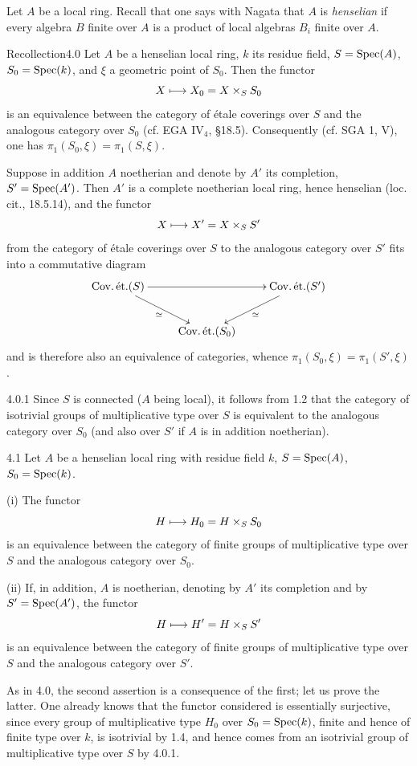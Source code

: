 Let $A$ be a local ring. Recall that one says with Nagata that $A$ is \emph{henselian} if every algebra $B$ finite over $A$ is a product of local algebras $B_i$ finite over $A$.
\begin{enonce}{Recollection}{4.0}\label{X.4.0}
 Let $A$ be a henselian local ring, $k$ its residue field, $S=\operatorname{Spec}(A)$, $S_0=\operatorname{Spec}(k)$, and $\xi$ a geometric point of $S_0$. Then the functor
\[
X\longmapsto X_0=X\times_S S_0
\]
is an equivalence between the category of étale coverings over $S$ and the analogous category over $S_0$ (cf. EGA IV$_4$, \S18.5). Consequently (cf. SGA 1, V), one has $\pi_1(S_0,\xi)=\pi_1(S,\xi)$.

Suppose in addition $A$ noetherian and denote by $A'$ its completion, $S'=\operatorname{Spec}(A')$. Then $A'$ is a complete noetherian local ring, hence henselian (loc. cit., 18.5.14), and the functor
\[
X\longmapsto X'=X\times_S S'
\]
from the category of étale coverings over $S$ to the analogous category over $S'$ fits into a commutative diagram
\[
\xymatrix{\operatorname{Cov.\acute et.}(S)\ar[rr]\ar[dr]_\simeq&&\operatorname{Cov.\acute et.}(S')\ar[dl]^\simeq\\&\operatorname{Cov.\acute et.}(S_0)&}
\]
and is therefore also an equivalence of categories, whence $\pi_1(S_0,\xi)=\pi_1(S',\xi)$.
\end{enonce}
\begin{remark}{4.0.1}\label{X.4.0.1}
Since $S$ is connected ($A$ being local), it follows from 1.2 that the category of isotrivial groups of multiplicative type over $S$ is equivalent to the analogous category over $S_0$ (and also over $S'$ if $A$ is in addition noetherian).
\end{remark}
\begin{lemma}{4.1}\label{X.4.1}
Let $A$ be a henselian local ring with residue field $k$, $S=\operatorname{Spec}(A)$, $S_0=\operatorname{Spec}(k)$.

(i) The functor
\[
H\longmapsto H_0=H\times_S S_0
\]
is an equivalence between the category of finite groups of multiplicative type over $S$ and the analogous category over $S_0$.

(ii) If, in addition, $A$ is noetherian, denoting by $A'$ its completion and by $S'=\operatorname{Spec}(A')$, the functor
\[
H\longmapsto H'=H\times_S S'
\]
is an equivalence between the category of finite groups of multiplicative type over $S$ and the analogous category over $S'$.
\end{lemma}
As in 4.0, the second assertion is a consequence of the first; let us prove the latter. One already knows that the functor considered is essentially surjective, since every group of multiplicative type $H_0$ over $S_0=\operatorname{Spec}(k)$, finite and hence of finite type over $k$, is isotrivial by 1.4, and hence comes from an isotrivial group of multiplicative type over $S$ by 4.0.1.


